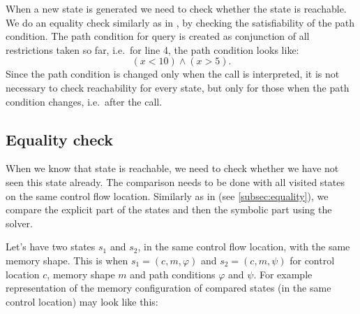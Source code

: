 When a new state is generated we need to check whether the state is reachable.
We do an equality check similarly as in \SymDIVINE, by checking the satisfiability of the
path condition. The path condition for \SMT query is created as conjunction of
all restrictions taken so far, i.e.~for line 4, the path condition looks like:
\[ (x < 10) \wedge (x > 5).\]
Since the path condition is changed only when the  call is
interpreted, it is not necessary to check reachability for every state, but only
for those when the path condition changes, i.e.~after the  call.

\subsection{Equality check}

When we know that state is reachable, we need to check whether we have not seen
this state already. The comparison needs to be done with all visited states on
the same control flow location. Similarly as in \SymDIVINE (see
\autoref{subsec:equality}), we compare the explicit part of the
states and then the symbolic part using the \SMT solver.

Let's have two states $s_1$ and $s_2$, in the same control flow location, with
the same memory shape. This is when $s_1 = (c, m, \varphi)$ and $s_2 = (c,
m, \psi)$ for control location $c$, memory shape $m$ and path conditions $\varphi$ and $\psi$.
For example representation of the memory configuration of compared states (in
the same control location) may look like this:

